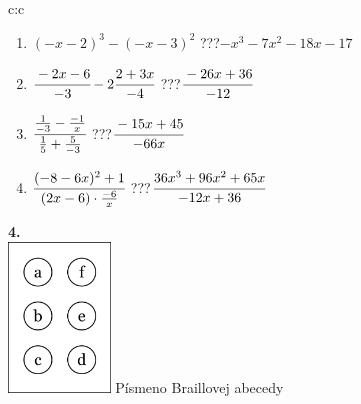 \documentclass[10pt]{report}
\begin{document}
\begin{tabular}{c:c}
\begin{minipage}[c][104.5mm][t]{0.5\linewidth}
\begin{center}
\begin{minipage}{0.79\linewidth}
\begin{center}
\begin{varwidth}{\linewidth}
\begin{enumerate}
\item $(-x-2)^3-(-x-3)^2$\quad \dotfill\; ???\;\dotfill \quad $-x^3-7x^2-18x-17$
\item $\cfrac{-2x-6}{-3}-2\cfrac{2+3x}{-4}$\quad \dotfill\; ???\;\dotfill \quad $\cfrac{-26x+36}{-12}$
\item $\cfrac{\frac{1}{-3}-\frac{-1}{x}}{\frac{1}{5}+\frac{5}{-3}}$\quad \dotfill\; ???\;\dotfill \quad $\cfrac{-15x+45}{-66x}$
\item $\cfrac{(-8-6x)^2+1}{(2x-6)\cdot\frac{-6}{x}}$\quad \dotfill\; ???\;\dotfill \quad $\cfrac{36x^3+96x^2+65x}{-12x+36}$
\end{enumerate}
\end{varwidth}
\end{center}
\end{minipage}
\begin{minipage}{0.20\linewidth}
\begin{center}
{\Huge\bfseries 4.} \\[2mm]
\includegraphics[height=40mm]{../images/braille.png}
{\small Písmeno Braillovej abecedy}
\end{center}
\end{minipage}
\end{center}
\end{minipage}
%
\end{tabular}
\newpage
\thispagestyle{empty}
\end{document}
